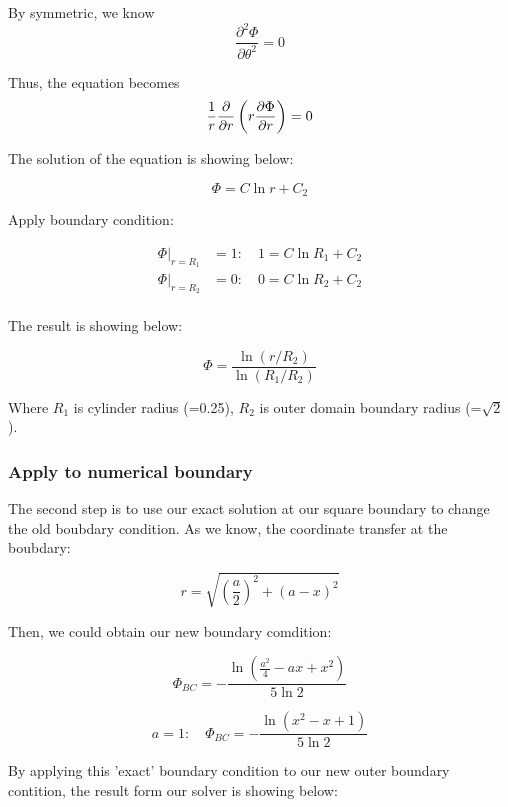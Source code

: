 \documentclass[12pt]{article}
\begin{document}
By symmetric, we know $$\frac{\partial^2 \Phi}{\partial \theta^2} = 0$$

Thus, the equation becomes
\begin{equation}
    \frac{1}{r} \frac{\partial}{\partial r} \left( r \frac{\partial \Phi}{\partial r} \right) = 0 \\
\end{equation}



The solution of the equation is showing below:

\begin{equation}
    \Phi = C \ln r + C_2
\end{equation}



Apply boundary condition:

\begin{align*}
    \Phi \bigg|_{r=R_1} &= 1: \quad 1 = C \ln R_1 + C_2 \\
    \Phi \bigg|_{r=R_2} &= 0: \quad 0 = C \ln R_2 + C_2 \\
\end{align*}

The result is showing below:

\begin{equation}
    \Phi = \frac{\ln(r/R_2)}{\ln(R_1/R_2)} 
\end{equation}

Where $R_1$ is cylinder radius (=0.25), $R_2$ is outer domain boundary radius 
(=$\sqrt{2}$).


\subsubsection{Apply to numerical boundary}
The second step is to use our exact solution at our square boundary to change the 
old boubdary condition. As we know, the coordinate transfer at the boubdary:


\[
r = \sqrt{\left(\frac{a}{2}\right)^2 + \left(a - x\right)^2}
\]

Then, we could obtain our new boundary comdition:

\[
\Phi_{BC} = -\frac{\ln\left(\frac{a^2}{4} - ax + x^2\right)}{5 \ln 2}
\]

\[
a = 1: \quad \Phi_{BC} = -\frac{\ln\left(x^2 - x + 1\right)}{5 \ln 2}
\]


By applying this 'exact' boundary condition to our new outer boundary contition, 
the result form our solver is showing below:
\end{document}
